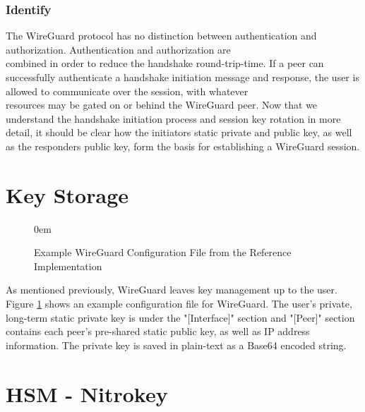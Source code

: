 \documentclass [11pt, proquest] {uwthesis}[2020/02/24]
\begin{document}
\subsubsection{Identify}
The WireGuard protocol has no distinction between authentication and authorization. Authentication and authorization are \\ combined in order to reduce the handshake round-trip-time. 
If a peer can successfully authenticate a handshake initiation message and response, the user is allowed to communicate over the session, with whatever \\ resources may be gated on or behind the WireGuard peer.
Now that we understand the handshake initiation process and session key rotation in more detail, it should be clear how the initiators static private and public key, as well as the responders public key, form the basis for establishing a WireGuard session.

\section{Key Storage}

\begin{figure}
\centering
\itemsep0em 
\caption{Example WireGuard Configuration File from the Reference Implementation }
\label{fig:wg_config}
\end{figure}
As mentioned previously, WireGuard leaves key management up to the user.
Figure \ref{fig:wg_config} shows an example configuration file for WireGuard. The user's private, long-term static private key is under the "[Interface]" section and "[Peer]" section contains each peer's pre-shared static public key, as well as IP address information. The private key is saved in plain-text as a Base64 encoded string.

\section{HSM - Nitrokey}
\end{document}
